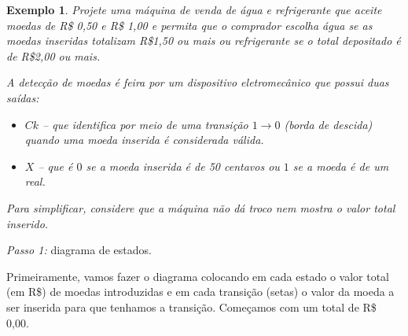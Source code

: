 \documentclass[a4paper,12pt,notitlepage]{article}
\newtheorem{ex}{Exemplo}
\def\passo#1{\vspace{1ex}\noindent{}\emph{Passo #1:}}
\begin{document}
\begin{ex}
Projete uma máquina de venda de água e refrigerante que aceite moedas de
R\$ 0,50 e R\$ 1,00 e permita que o comprador escolha \emph{água} se as
moedas inseridas totalizam R\$1,50 ou mais ou \emph{refrigerante} se o
total depositado é de R\$2,00 ou mais.

A detecção de moedas é feira por um dispositivo eletromecânico que possui
duas saídas:
\begin{itemize}
  \item $Ck$ -- que identifica por meio de uma transição $1 \rightarrow 0$
        (borda de descida) quando uma moeda inserida é considerada válida.
  \item $X$ -- que é $0$ se a moeda inserida é de 50 centavos ou $1$ se
        a moeda é de um real.
\end{itemize}

Para simplificar, considere que a máquina não dá troco nem mostra o valor
total inserido.
\end{ex}

\passo{1} diagrama de estados.

Primeiramente, vamos fazer o diagrama colocando em cada estado o valor total
(em R\$) de moedas introduzidas e em cada transição (setas) o valor da moeda
a ser inserida para que tenhamos a transição. Começamos com um total de
R\$ 0,00.

\begin{center}
\end{center}
\end{document}
